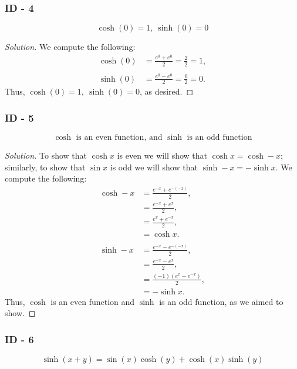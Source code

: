 \documentclass[letterpaper, 12pt]{amsart}
\theoremstyle{definition}  %
\begin{document}
			\subsubsection*{ID - 4}
			\[ \cosh(0) = 1, \ \sinh(0) = 0 \]

			\begin{proof}[Solution]
			We compute the following:
				\begin{align*}
					\cosh(0) &= \frac{e^{0} + e^{0}}{2} = \frac{2}{2} = 1, \\
					\\
					\sinh(0) &= \frac{e^{0} - e^{0}}{2} = \frac{0}{2} = 0.
				\end{align*}
			Thus, $\cosh(0) = 1, \ \sinh(0) = 0$, as desired.	
			\end{proof}

			\subsubsection*{ID - 5}
			\[ \text{$\cosh$ is an even function, and $\sinh$ is an odd function} \]

			\begin{proof}[Solution]
			To show that $\cosh x$ is even we will show that $\cosh x = \cosh -x$; similarly, to show that $\sin x$ is odd we will show that $\sinh -x = - \sinh x$.
			We compute the following:
				\begin{align*}
					\cosh -x &= \frac{e^{-x} + e^{-(-x)}}{2}, \\
					&= \frac{e^{-x} + e^{x}}{2}, \\
					&= \frac{e^{x} + e^{-x}}{2}, \\
					&= \cosh x. \\
					\\
					\sinh -x &= \frac{e^{-x} - e^{-(-x)}}{2}, \\
					&= \frac{e^{-x} - e^{x}}{2}, \\
					&= \frac{(-1)(e^{x} - e^{-x})}{2}, \\
					&= - \sinh x.
				\end{align*}
			Thus, $\cosh$ is an even function and $\sinh$ is an odd function, as we aimed to show.	
			\end{proof}
			\pagebreak

			\subsubsection*{ID - 6}
			\[ \sinh(x + y) = \sin(x)\cosh(y) + \cosh(x)\sinh(y) \]
\end{document}
